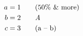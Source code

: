 \begin{align}
  a &= 1 \tag*{(50\% \& more)}\\
  b &= 2 \tag*{\emph{A}}\\
  c &= 3\tag*{(a -- b)}
\end{align}
\RequirePackage{amsmath}
\endinput
